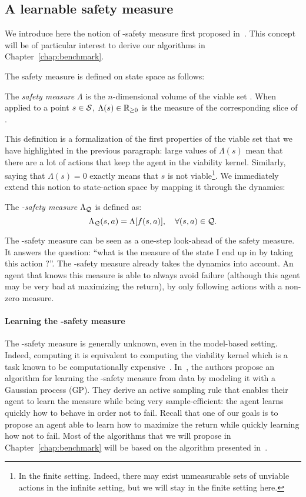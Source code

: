 	\subsection{A learnable safety measure}
	We introduce here the notion of \Q-safety measure first proposed in~\cite{heim2020learnable}. This concept will be of particular interest to derive our algorithms in Chapter~\ref{chap:benchmark}.\par
	The safety measure is defined on state space as follows:
	\begin{definition}
		The\emph{ safety measure} $\Lambda$ is the $n$-dimensional volume of the viable set \QV. When applied to a point $s\in\S$, $\Lambda(s) \in \R_{\geq0}$ is the measure of the corresponding slice of \QV.
	\end{definition}
	This definition is a formalization of the first properties of the viable set that we have highlighted in the previous paragraph: large values of $\Lambda(s)$ mean that there are a lot of actions that keep the agent in the viability kernel. Similarly, saying that $\Lambda(s) = 0$ exactly means that $s$ is not viable\footnote{In the finite setting. Indeed, there may exist unmeasurable sets of unviable actions in the infinite setting, but we will stay in the finite setting here.}. We immediately extend this notion to state-action space by mapping it through the dynamics:
	\begin{definition}
		The\emph{ \Q-safety measure} $\Lambda_\Q$ is defined as:
		\begin{equation*}
			\Lambda_\Q(s, a) = \Lambda[f(s, a)],\quad \forall (s, a) \in \Q.
		\end{equation*}
	\end{definition}
	The \Q-safety measure can be seen as a one-step look-ahead of the safety measure. It answers the question: \enquote{what is the measure of the state I end up in by taking this action ?}. The \Q-safety measure already takes the dynamics into account. An agent that knows this measure is able to always avoid failure (although this agent may be very bad at maximizing the return), by only following actions with a non-zero measure.
	\paragraph{Learning the \Q-safety measure} The \Q-safety measure is generally unknown, even in the model-based setting. Indeed, computing it is equivalent to computing the viability kernel which is a task known to be computationally expensive~\cite{aubin2011viability}. In~\cite{heim2020learnable}, the authors propose an algorithm for learning the \Q-safety measure from data by modeling it with a Gaussian process (GP). They derive an active sampling rule that enables their agent to learn the measure while being very sample-efficient: the agent learns quickly how to behave in order not to fail. Recall that one of our goals is to propose an agent able to learn how to maximize the return while quickly learning how not to fail. Most of the algorithms that we will propose in Chapter~\ref{chap:benchmark} will be based on the algorithm presented in~\cite{heim2020learnable}.
